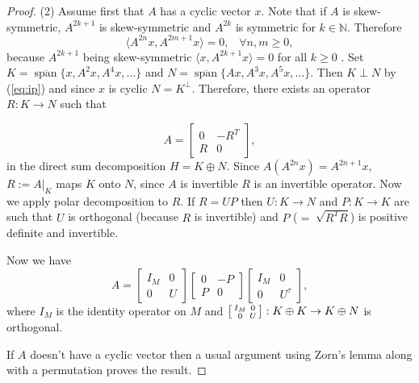 \documentclass[12pt,a4paper,twoside]{article}
\numberwithin{equation}{section}
\theoremstyle{definition}  %
\theoremstyle{plain}  %
\theoremstyle{remark} %
\DeclareMathOperator{\spn}{span}
\begin{document}
\begin{proof}(2)
  Assume first that $A$ has a cyclic vector $x$.
 Note that if $A$ is skew-symmetric, $A^{2k+1}$ is skew-symmetric and $A^{2k}$ is symmetric for $k\in \mathbb{N}$. Therefore 
 \begin{equation}\label{eq:ip}
 \langle A^{2n}x, A^{2m+1}x\rangle = 0, \phantom{...}\forall n,m \geq 0, 
 \end{equation} 
 because  $A^{2k+1}$ being skew-symmetric $\langle x, A^{2k+1}x\rangle = 0$ for all $k\geq 0$ . Set $K = \overline{\spn}\{x, A^2x,A^4x, \dots\}$ and $N =  \overline{\spn}\{Ax, A^3x,A^5x, \dots\}$. Then $K \perp N$ by (\ref{eq:ip}) and since $x$ is cyclic $N=K^{\perp}$. Therefore, there exists an operator $R: K\rightarrow N$ such that 

 \begin{equation}\label{eq:A}
  A  = \begin{bmatrix}
   0 & -R^{T}\\
   R & 0
  \end{bmatrix},
  \end{equation}
  in the direct sum decomposition $H= K\oplus N$. Since $A(A^{2n}x) = A^{2n+1}x$, $R := A|_{K}$ maps $K$ onto $N$, since $A$ is invertible  $R$ is an invertible operator. Now we apply polar decomposition to $R$. If $R= UP$ then $U:K\rightarrow N$ and $P:K\rightarrow K$ are such that $U$ is orthogonal (because $R$ is invertible) and $P$ ($=\sqrt[]{R^{T}R}$) is positive definite and invertible. %
 
  Now we have \begin{equation}
 A = \begin{bmatrix}
  I_M & 0\\
  0 & U
 \end{bmatrix} \begin{bmatrix}
   0 & -P\\
   P & 0
  \end{bmatrix} \begin{bmatrix}
  I_M & 0\\
  0 & U^{\tau}
  \end{bmatrix}, 
  \end{equation}
  where $I_M $ is the identity operator on $M$ and $\begin{bsmallmatrix}
  I_M & 0\\
  0 & U
  \end{bsmallmatrix} : K\oplus K \rightarrow K\oplus N$ is orthogonal. %
 
  If $A$ doesn't have a cyclic vector then a usual argument using Zorn's lemma along with a permutation proves the result.
\end{proof}
\end{document}
